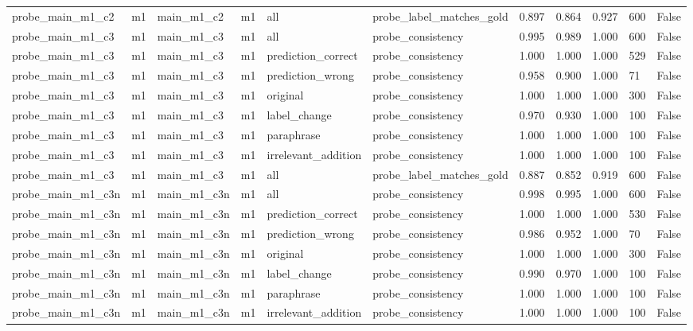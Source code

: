 \begin{tabular}{lllllllllll}
probe\_main\_m1\_c2 & m1 & main\_m1\_c2 & m1 & all & probe\_label\_matches\_gold & 0.897 & 0.864 & 0.927 & 600 & False \\
probe\_main\_m1\_c3 & m1 & main\_m1\_c3 & m1 & all & probe\_consistency & 0.995 & 0.989 & 1.000 & 600 & False \\
probe\_main\_m1\_c3 & m1 & main\_m1\_c3 & m1 & prediction\_correct & probe\_consistency & 1.000 & 1.000 & 1.000 & 529 & False \\
probe\_main\_m1\_c3 & m1 & main\_m1\_c3 & m1 & prediction\_wrong & probe\_consistency & 0.958 & 0.900 & 1.000 & 71 & False \\
probe\_main\_m1\_c3 & m1 & main\_m1\_c3 & m1 & original & probe\_consistency & 1.000 & 1.000 & 1.000 & 300 & False \\
probe\_main\_m1\_c3 & m1 & main\_m1\_c3 & m1 & label\_change & probe\_consistency & 0.970 & 0.930 & 1.000 & 100 & False \\
probe\_main\_m1\_c3 & m1 & main\_m1\_c3 & m1 & paraphrase & probe\_consistency & 1.000 & 1.000 & 1.000 & 100 & False \\
probe\_main\_m1\_c3 & m1 & main\_m1\_c3 & m1 & irrelevant\_addition & probe\_consistency & 1.000 & 1.000 & 1.000 & 100 & False \\
probe\_main\_m1\_c3 & m1 & main\_m1\_c3 & m1 & all & probe\_label\_matches\_gold & 0.887 & 0.852 & 0.919 & 600 & False \\
probe\_main\_m1\_c3n & m1 & main\_m1\_c3n & m1 & all & probe\_consistency & 0.998 & 0.995 & 1.000 & 600 & False \\
probe\_main\_m1\_c3n & m1 & main\_m1\_c3n & m1 & prediction\_correct & probe\_consistency & 1.000 & 1.000 & 1.000 & 530 & False \\
probe\_main\_m1\_c3n & m1 & main\_m1\_c3n & m1 & prediction\_wrong & probe\_consistency & 0.986 & 0.952 & 1.000 & 70 & False \\
probe\_main\_m1\_c3n & m1 & main\_m1\_c3n & m1 & original & probe\_consistency & 1.000 & 1.000 & 1.000 & 300 & False \\
probe\_main\_m1\_c3n & m1 & main\_m1\_c3n & m1 & label\_change & probe\_consistency & 0.990 & 0.970 & 1.000 & 100 & False \\
probe\_main\_m1\_c3n & m1 & main\_m1\_c3n & m1 & paraphrase & probe\_consistency & 1.000 & 1.000 & 1.000 & 100 & False \\
probe\_main\_m1\_c3n & m1 & main\_m1\_c3n & m1 & irrelevant\_addition & probe\_consistency & 1.000 & 1.000 & 1.000 & 100 & False \\

\end{tabular}
